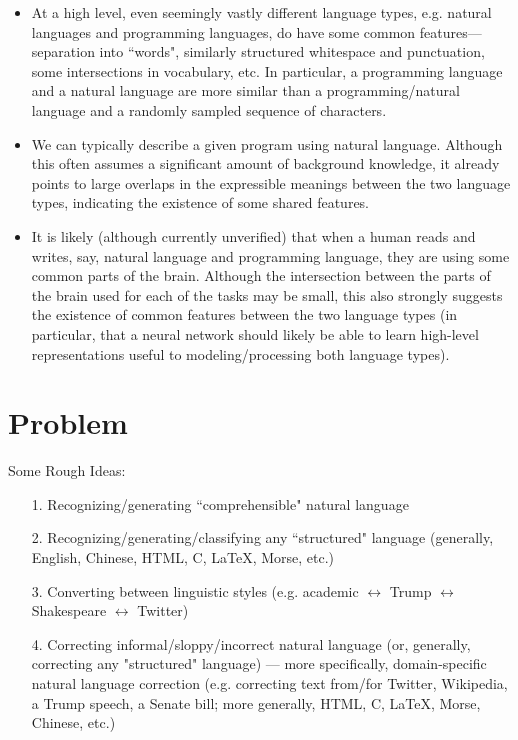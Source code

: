 \documentclass[12pt,letterpaper]{article}
\theoremstyle{remark}
\theoremstyle{plain}
\begin{document}
\begin{itemize}
\item At a high level, even seemingly vastly different language types, e.g. natural languages and programming languages, do have some common features---separation into ``words", similarly structured whitespace and punctuation, some intersections in vocabulary, etc. In particular, a programming language and a natural language are more similar than a programming/natural language and a randomly sampled sequence of characters.
\item We can typically describe a given program using natural language. Although this often assumes a significant amount of background knowledge, it already points to large overlaps in the expressible meanings between the two language types, indicating the existence of some shared features. 
\item It is likely (although currently unverified) that when a human reads and writes, say, natural language and programming language, they are using some common parts of the brain. Although the intersection between the parts of the brain used for each of the tasks may be small, this also strongly suggests the existence of common features between the two language types (in particular, that a neural network should likely be able to learn high-level representations useful to modeling/processing both language types). 
\end{itemize}








\section{Problem}

Some Rough Ideas:

\begin{enumerate}
\item[1.] Recognizing/generating ``comprehensible" natural language
\item[2.] Recognizing/generating/classifying any ``structured" language (generally, English, Chinese, HTML, C, LaTeX, Morse, etc.)
\item[3.] Converting between linguistic styles (e.g. academic $\leftrightarrow$ Trump $\leftrightarrow$ Shakespeare $\leftrightarrow$ Twitter)
\item[4.] Correcting informal/sloppy/incorrect natural language (or, generally, correcting any "structured" language) --- more specifically, domain-specific natural language correction (e.g. correcting text from/for Twitter, Wikipedia, a Trump speech, a Senate bill; more generally, HTML, C, LaTeX, Morse, Chinese, etc.)
\end{enumerate}
\end{document}
